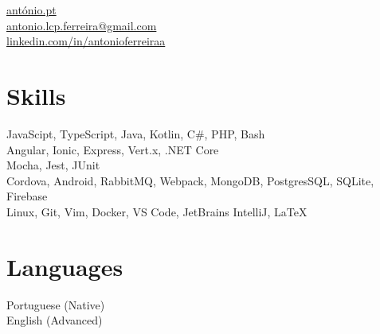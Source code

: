 \documentclass[]{hieudo-build}
\begin{document}
%
%
{
	\faHome \space \href{http://www.antónio.pt}{antónio.pt 
	}\\
	\faEnvelope \space \href{mailto:antonio.lcp.ferreira@gmail.com}{antonio.lcp.ferreira@gmail.com}\\
	\faLinkedinSquare \space \href{https://www.linkedin.com/in/antonioferreiraa}{linkedin.com/in/antonioferreiraa}
}
    
%
%
\begin{minipage}[t]{0.25\textwidth} 



\section{Skills}
JavaScipt, TypeScript, Java, Kotlin, C\#, PHP, Bash\\ 
\sectionsep
{}
Angular, Ionic, Express, Vert.x, .NET Core \\
\sectionsep
{}
Mocha, Jest, JUnit \\
\sectionsep
{}
Cordova, Android, RabbitMQ, Webpack, MongoDB, PostgresSQL, SQLite, Firebase \\
\sectionsep
{}
Linux, Git, Vim, Docker, VS Code, JetBrains IntelliJ,  {\selectfont\LaTeX} \\

\sectionsep

\section{Languages}
Portuguese (Native) \\
English (Advanced)
\sectionsep


\sectionsep

%
%
\end{minipage} 
\end{document}
